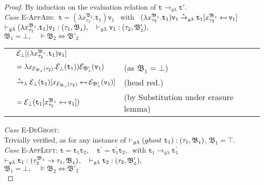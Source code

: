 \begin{proof} 
By induction on the evaluation relation of 
$\texttt{t} \rightarrow_{g\lambda} \texttt{t}'$. \\

\noindent\textit{Case} \textsc{E-AppAbs}: \qquad
$ ~\texttt{t} 
= (\lambda x^{\mathfrak{B_{2}}}_{\tau_{2}}.
		\texttt{t}_{1})\texttt{v}_{1}$ ~with~
$ (\lambda x^{\mathfrak{B_{2}}}_{\tau_{2}}.
		\texttt{t}_{1})\texttt{v}_{1} 
	\stackrel{\epsilon\quad}{\rightarrow_{g\lambda}}  
	\texttt{t}_{1} [x^{\mathfrak{B_{2}}}_{\tau_{2}} \mapsfrom \texttt{v}_{1}]$\\
$ \vdash_{g\lambda} (\lambda x^{\mathfrak{B_{2}}}_{\tau_{2}}.\texttt{t}_{1})\texttt{v}_{1} : (\tau_{1}, \mathfrak{B_{1}}), \quad 
 	\vdash_{g\lambda} \texttt{v}_{1} : (\tau_{2}, \mathfrak{B'_{2}}), $ \\
$ \mathfrak{B_{1}} = \bot,  \quad 
	\vDash\mathfrak{B_{2}} \Leftrightarrow \mathfrak{B'_{2}} $ 

\begin{center}
	\begin{tabular}{lll}
   & $ \mathcal{E}_{\bot}
  [(\lambda x^{\mathfrak{B_{2}}}_{\tau_{2}}.
  		\texttt{t}_{1})\texttt{v}_{1}]$ &\\
   & $ = \lambda x_{\mathcal{E}_{\mathfrak{B_{2}}}(\tau_{2})}. 
   \mathcal{E}_{\bot}(\texttt{t}_{1}))\mathcal{E}_{\mathfrak{B'_{2}}}(\texttt{v}_{1})$ 
   & (as $ \mathfrak{B_{1}} = \bot $)  \\
&  $ \stackrel{\epsilon~~}{\rightarrow_{\lambda}} 
	   \mathcal{E}_{\bot}(\texttt{t}_{1}) [x_{\mathcal{E}_{\mathfrak{B_{2}}}(\tau_{2})} \mapsfrom \mathcal{E}_{\mathfrak{B'_{2}}}(\texttt{v}_{1})]$ & (head red.) \\
& $ = \mathcal{E}_{\bot}(\texttt{t}_{1} [x^{\mathfrak{B_{2}}}_{\tau_{2}} \mapsfrom \texttt{v}_{1}]) $ & (by Substitution under erasure lemma)
	\end{tabular}
\end{center}

\noindent\textit{Case} \textsc{E-DeGhost}:  \qquad \\ Trivially verified,
as for any instance of $\vdash_{g\lambda} (ghost ~ \texttt{t}_{1}) : (\tau_{1}, \mathfrak{B_{1}})$, $\mathfrak{B_{1}} = \top $.\\

\noindent\textit{Case} \textsc{E-AppLeft}: \qquad 
 $\texttt{t} = \texttt{t}_{1} \texttt{t}_{2},\quad
 \texttt{t}^{'} = \texttt{t}^{'}_{1} \texttt{t}_{2}, ~ \text{ with }
 \texttt{t}_{1} \rightarrow_{g\lambda} \texttt{t}^{'}_{1}$ \\
$\vdash_{g\lambda} \texttt{t}_{1} : (\tau_{2}^{\mathfrak{B_{2}}} \rightarrow \tau_{1}, \mathfrak{B_{1}})$,  ~
$\vdash_{g\lambda} \texttt{t}_{2} : (\tau_{2}, \mathfrak{B'_{2}}), $ \\ 
$ \mathfrak{B_{1}} = \bot,  \quad 
\vDash\mathfrak{B_{2}} \Leftrightarrow \mathfrak{B'_{2}} $ \\


\end{proof}
